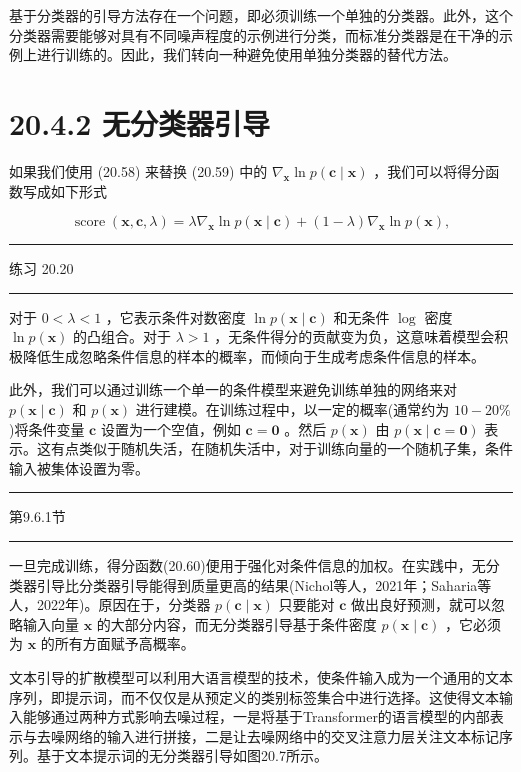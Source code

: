 \documentclass[10pt]{report}
\newcommand{\HRule}{\begin{center}\rule{0.9\linewidth}{0.2mm}\end{center}}
\begin{document}
基于分类器的引导方法存在一个问题，即必须训练一个单独的分类器。此外，这个分类器需要能够对具有不同噪声程度的示例进行分类，而标准分类器是在干净的示例上进行训练的。因此，我们转向一种避免使用单独分类器的替代方法。

\section*{20.4.2 无分类器引导}

如果我们使用 (20.58) 来替换 (20.59) 中的 \({\nabla }_{\mathbf{x}}\ln p\left( {\mathbf{c} \mid  \mathbf{x}}\right)\) ，我们可以将得分函数写成如下形式

\[
\operatorname{score}\left( {\mathbf{x},\mathbf{c},\lambda }\right)  = \lambda {\nabla }_{\mathbf{x}}\ln p\left( {\mathbf{x} \mid  \mathbf{c}}\right)  + \left( {1 - \lambda }\right) {\nabla }_{\mathbf{x}}\ln p\left( \mathbf{x}\right) , \tag{20.60}
\]

\HRule

练习 20.20

\HRule

对于 \(0 < \lambda  < 1\) ，它表示条件对数密度 \(\ln p\left( {\mathbf{x} \mid  \mathbf{c}}\right)\) 和无条件 \(\log\) 密度 \(\ln p\left( \mathbf{x}\right)\) 的凸组合。对于 \(\lambda  > 1\) ，无条件得分的贡献变为负，这意味着模型会积极降低生成忽略条件信息的样本的概率，而倾向于生成考虑条件信息的样本。

此外，我们可以通过训练一个单一的条件模型来避免训练单独的网络来对 \(p\left( {\mathbf{x} \mid  \mathbf{c}}\right)\) 和 \(p\left( \mathbf{x}\right)\) 进行建模。在训练过程中，以一定的概率(通常约为 \({10} - {20}\%\) )将条件变量 \(\mathbf{c}\) 设置为一个空值，例如 \(\mathbf{c} = \mathbf{0}\) 。然后 \(p\left( \mathbf{x}\right)\) 由 \(p\left( {\mathbf{x} \mid  \mathbf{c} = \mathbf{0}}\right)\) 表示。这有点类似于随机失活，在随机失活中，对于训练向量的一个随机子集，条件输入被集体设置为零。

\HRule

第9.6.1节

\HRule

一旦完成训练，得分函数(20.60)便用于强化对条件信息的加权。在实践中，无分类器引导比分类器引导能得到质量更高的结果(Nichol等人，2021年；Saharia等人，2022年)。原因在于，分类器 \(p\left( {\mathbf{c} \mid  \mathbf{x}}\right)\) 只要能对 \(\mathbf{c}\) 做出良好预测，就可以忽略输入向量 \(\mathbf{x}\) 的大部分内容，而无分类器引导基于条件密度 \(p\left( {\mathbf{x} \mid  \mathbf{c}}\right)\) ，它必须为 \(\mathbf{x}\) 的所有方面赋予高概率。

文本引导的扩散模型可以利用大语言模型的技术，使条件输入成为一个通用的文本序列，即提示词，而不仅仅是从预定义的类别标签集合中进行选择。这使得文本输入能够通过两种方式影响去噪过程，一是将基于Transformer的语言模型的内部表示与去噪网络的输入进行拼接，二是让去噪网络中的交叉注意力层关注文本标记序列。基于文本提示词的无分类器引导如图20.7所示。
\end{document}
